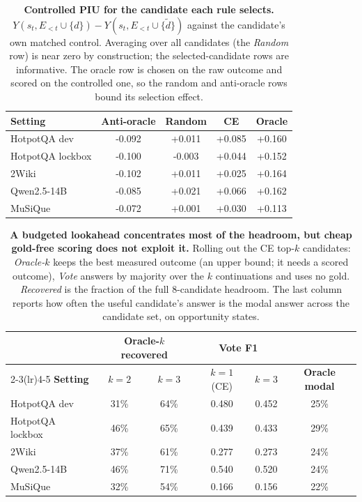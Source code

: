 \begin{table}[t]
\centering
\small
\caption{\textbf{Controlled PIU for the candidate each rule selects.}
$Y(s_t,E_{<t}\cup\{d\})-Y(s_t,E_{<t}\cup\{\tilde d\})$ against the
candidate's own matched control. Averaging over all candidates (the
\emph{Random} row) is near zero by construction; the selected-candidate
rows are informative. The oracle row is chosen on the raw outcome and
scored on the controlled one, so the random and anti-oracle rows bound
its selection effect.}
\label{tab:w6}
\begin{tabular}{lcccc}
\toprule
\textbf{Setting} & \textbf{Anti-oracle} & \textbf{Random} & \textbf{CE} & \textbf{Oracle} \\
\midrule
HotpotQA dev & -0.092 & +0.011 & +0.085 & +0.160 \\
HotpotQA lockbox & -0.100 & -0.003 & +0.044 & +0.152 \\
2Wiki & -0.102 & +0.011 & +0.025 & +0.164 \\
Qwen2.5-14B & -0.085 & +0.021 & +0.066 & +0.162 \\
MuSiQue & -0.072 & +0.001 & +0.030 & +0.113 \\
\bottomrule
\end{tabular}
\end{table}

\begin{table}[t]
\centering
\small
\caption{\textbf{A budgeted lookahead concentrates most of the
headroom, but cheap gold-free scoring does not exploit it.}
Rolling out the CE top-$k$ candidates: \emph{Oracle-$k$} keeps the best
measured outcome (an upper bound; it needs a scored outcome),
\emph{Vote} answers by majority over the $k$ continuations and uses no
gold. \emph{Recovered} is the fraction of the full 8-candidate headroom.
The last column reports how often the useful candidate's answer is the
modal answer across the candidate set, on opportunity states.}
\label{tab:lookahead}
\begin{tabular}{lccccc}
\toprule
& \multicolumn{2}{c}{\textbf{Oracle-$k$ recovered}} & \multicolumn{2}{c}{\textbf{Vote F1}} & \\
\cmidrule(lr){2-3}\cmidrule(lr){4-5}
\textbf{Setting} & $k{=}2$ & $k{=}3$ & $k{=}1$ (CE) & $k{=}3$ & \textbf{Oracle modal} \\
\midrule
HotpotQA dev & 31\% & 64\% & 0.480 & 0.452 & 25\% \\
HotpotQA lockbox & 46\% & 65\% & 0.439 & 0.433 & 29\% \\
2Wiki & 37\% & 61\% & 0.277 & 0.273 & 24\% \\
Qwen2.5-14B & 46\% & 71\% & 0.540 & 0.520 & 24\% \\
MuSiQue & 32\% & 54\% & 0.166 & 0.156 & 22\% \\
\bottomrule
\end{tabular}
\end{table}

